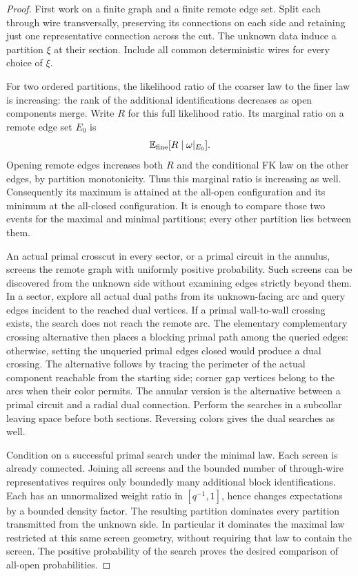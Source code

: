 \begin{proof}
First work on a finite graph and a finite remote edge set. Split each
through wire transversally, preserving its connections on each side and
retaining just one representative connection across the cut. The unknown
data induce a partition $\xi$ at their section. Include all common
deterministic wires for every choice of $\xi$.

For two ordered partitions, the likelihood ratio of the coarser law to
the finer law is increasing: the rank of the additional identifications
decreases as open components merge. Write $R$ for this full likelihood
ratio. Its marginal ratio on a remote edge set $E_0$ is
\[
 \mathbb E_{\rm fine}[R\mid\omega|_{E_0}].
\]
Opening remote edges increases both $R$ and the conditional FK law on
the other edges, by partition monotonicity. Thus this marginal ratio is
increasing as well. Consequently its maximum is attained at the all-open
configuration and its minimum at the all-closed configuration. It is
enough to compare those two events for the maximal and minimal partitions;
every other partition lies between them.

An actual primal crosscut in every sector, or a primal circuit in the
annulus, screens the remote graph with uniformly positive probability.
Such screens can be discovered from the unknown side without examining
edges strictly beyond them. In a sector, explore all actual dual paths
from its unknown-facing arc and query edges incident to the reached dual
vertices. If a primal wall-to-wall crossing exists, the search does not
reach the remote arc. The elementary complementary crossing alternative
then places a blocking primal path among the queried edges: otherwise,
setting the unqueried primal edges closed would produce a dual crossing.
The alternative follows by tracing the perimeter of the actual component
reachable from the starting side; corner gap vertices belong to the arcs
when their color permits. The annular version is the alternative between
a primal circuit and a radial dual connection. Perform the searches in a
subcollar leaving space before both sections. Reversing colors gives the
dual searches as well.

Condition on a successful primal search under the minimal law. Each
screen is already connected. Joining all screens and the bounded number
of through-wire representatives requires only boundedly many additional
block identifications. Each has an unnormalized weight ratio in
$[q^{-1},1]$, hence changes expectations by a bounded density factor.
The resulting partition dominates every partition transmitted from the
unknown side. In particular it dominates the maximal law restricted at
this same screen geometry, without requiring that law to contain the
screen. The positive probability of the search proves the desired
comparison of all-open probabilities.


\end{proof}
